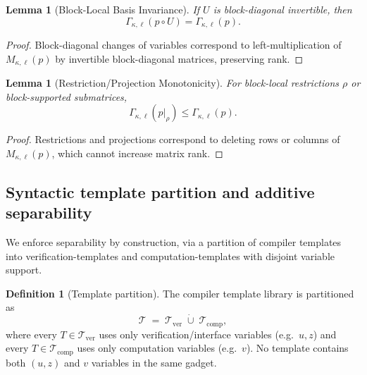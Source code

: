 \documentclass[12pt]{article}
\newtheorem{lemma}[theorem]{Lemma}
\theoremstyle{definition}
\newtheorem{definition}{Definition}
\theoremstyle{definition}
\theoremstyle{remark}
\theoremstyle{remark}
\begin{document}
\begin{lemma}[Block-Local Basis Invariance]\label{lem:basis-formal}
If $U$ is block-diagonal invertible, then
\[
\Gamma_{\kappa,\ell}(p \circ U) = \Gamma_{\kappa,\ell}(p).
\]
\end{lemma}

\begin{proof}
Block-diagonal changes of variables correspond to left-multiplication of $M_{\kappa,\ell}(p)$ by invertible block-diagonal matrices, preserving rank.
\end{proof}

\begin{lemma}[Restriction/Projection Monotonicity]\label{lem:mono-formal}
For block-local restrictions $\rho$ or block-supported submatrices,
\[
\Gamma_{\kappa,\ell}(p|_\rho) \leq \Gamma_{\kappa,\ell}(p).
\]
\end{lemma}

\begin{proof}
Restrictions and projections correspond to deleting
rows or columns of $M_{\kappa,\ell}(p)$,
which cannot increase matrix rank.
\end{proof}


\subsection{Syntactic template partition and additive separability}
\label{subsec:separability-template-partition}

We enforce separability by construction, via a partition of compiler templates
into verification-templates and computation-templates with disjoint variable support.

\begin{definition}[Template partition]
\label{def:template-partition}
The compiler template library is partitioned as
\[
\mathcal{T} \;=\; \mathcal{T}_{\mathrm{ver}} \;\dot{\cup}\; \mathcal{T}_{\mathrm{comp}},
\]
where every $T\in\mathcal{T}_{\mathrm{ver}}$ uses only verification/interface variables
(e.g.\ $u,z$) and every $T\in\mathcal{T}_{\mathrm{comp}}$ uses only computation variables
(e.g.\ $v$).  No template contains both $(u,z)$ and $v$ variables in the same gadget.
\end{definition}
\end{document}
